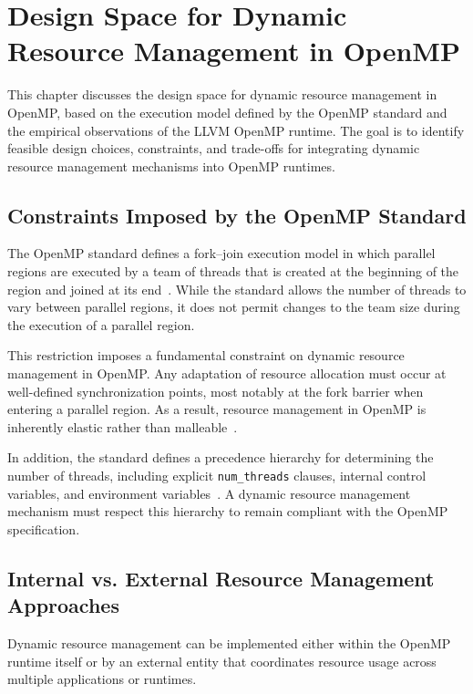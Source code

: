
\chapter{Design Space for Dynamic Resource Management in OpenMP}\label{chapter:design_space}

This chapter discusses the design space for dynamic resource management in OpenMP, based on the execution model defined by the OpenMP standard and the empirical observations of the LLVM OpenMP runtime. The goal is to identify feasible design choices, constraints, and trade-offs for integrating dynamic resource management mechanisms into OpenMP runtimes.

\section{Constraints Imposed by the OpenMP Standard}

The OpenMP standard defines a fork--join execution model in which parallel regions are executed by a team of threads that is created at the beginning of the region and joined at its end~\parencite{openmp60}. While the standard allows the number of threads to vary between parallel regions, it does not permit changes to the team size during the execution of a parallel region.

This restriction imposes a fundamental constraint on dynamic resource management in OpenMP. Any adaptation of resource allocation must occur at well-defined synchronization points, most notably at the fork barrier when entering a parallel region. As a result, resource management in OpenMP is inherently elastic rather than malleable~\parencite{Feitelson1996}.

In addition, the standard defines a precedence hierarchy for determining the number of threads, including explicit \texttt{num\_threads} clauses, internal control variables, and environment variables~\parencite{openmp60}. A dynamic resource management mechanism must respect this hierarchy to remain compliant with the OpenMP specification.

\section{Internal vs. External Resource Management Approaches}

Dynamic resource management can be implemented either within the OpenMP runtime itself or by an external entity that coordinates resource usage across multiple applications or runtimes.


